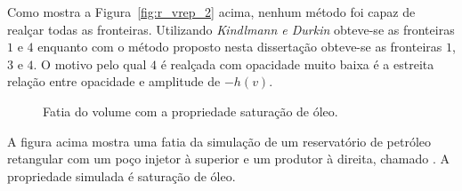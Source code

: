 	Como mostra a Figura~\ref{fig:r_vrep_2} acima, nenhum método foi capaz de realçar todas as fronteiras. Utilizando \textit{Kindlmann e Durkin} obteve-se as fronteiras $ 1 $ e $ 4 $ enquanto com o método proposto nesta dissertação obteve-se as fronteiras $ 1 $, $ 3 $ e $ 4 $. O motivo pelo qual $ 4 $ é realçada com opacidade muito baixa é a estreita relação entre opacidade e amplitude de $ -h(v) $.
	
\begin{figure}[h]
	\centering
	\caption{Fatia do volume  com a propriedade saturação de óleo.}
\end{figure}

	A figura acima mostra uma fatia da simulação de um reservatório de petróleo retangular com um poço injetor à superior e um produtor à direita, chamado . A propriedade simulada é saturação de óleo.


